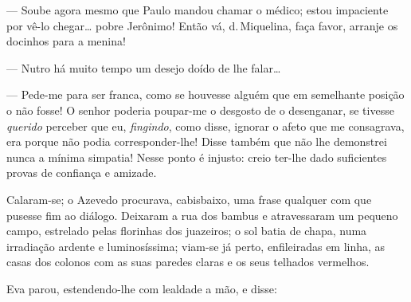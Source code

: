 {--- Soube agora mesmo que Paulo mandou chamar o médico;
estou impaciente por vê-lo chegar\ldots{} pobre Jerônimo! Então
vá, d.\,Miquelina, faça favor, arranje os docinhos para a menina!





--- Nutro há muito tempo um desejo doído de lhe
falar\ldots{}



--- Pede-me para ser franca, como se houvesse alguém
que em semelhante posição o não fosse! O senhor poderia
poupar-me o desgosto de o desenganar, se tivesse \emph{querido} perceber
que eu, \emph{fingindo}, como disse, ignorar o afeto
que me consagrava, era porque não podia corresponder-lhe! Disse
também que não lhe demonstrei nunca a mínima simpatia!
Nesse ponto é injusto: creio ter-lhe dado suficientes provas de
confiança e amizade.

Calaram-se; o Azevedo procurava, cabisbaixo, uma frase qualquer
com que pusesse fim ao diálogo. Deixaram a rua dos
bambus e atravessaram um pequeno campo, estrelado pelas
florinhas dos juazeiros; o sol batia de chapa, numa irradiação ardente e
luminosíssima; viam-se já perto, enfileiradas em linha, as casas dos
colonos com as suas paredes claras e os seus telhados
vermelhos.


Eva parou, estendendo-lhe com lealdade a mão, e disse:

}
